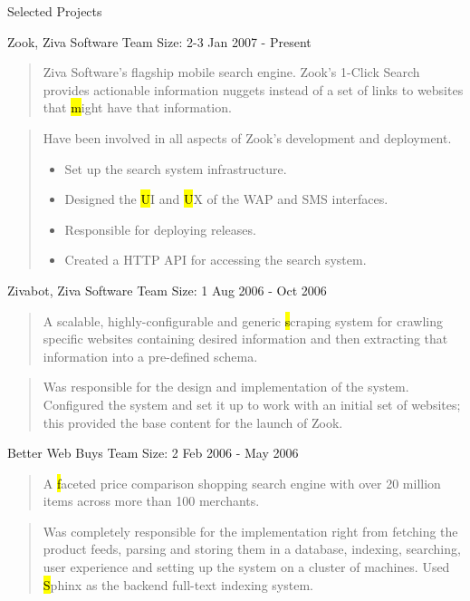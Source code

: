 \documentclass{resume}
\newcommand{\teamsize}{\hfill\sc\footnotesize Team Size: }
\begin{document}
\begin{category}{Selected Projects}{}
    \item {\topic Zook,} Ziva Software
        {\teamsize 2-3}
        {\period Jan 2007 - Present}

        \begin{quote}
            Ziva Software's flagship mobile search engine. Zook's 1-Click
            Search provides actionable information nuggets instead of a set of
            links to websites that {\hl might} have that information.
        \end{quote}

        \begin{quote}
            Have been involved in all aspects of Zook's development and
            deployment.
            \begin{itemize}
                \item Set up the search system infrastructure.
                \item Designed the {\hl UI} and {\hl UX} of the WAP and SMS
                    interfaces.
                \item Responsible for deploying releases.
                \item Created a HTTP API for accessing the search system.
            \end{itemize}
        \end{quote}

    \pagebreak

    \item {\topic Zivabot,} Ziva Software
        {\teamsize 1}
        {\period Aug 2006 - Oct 2006}
        \begin{quote}
            A scalable, highly-configurable and generic {\hl scraping system}
            for crawling specific websites containing desired information and
            then extracting that information into a pre-defined schema.
        \end{quote}
        \begin{quote}
            Was responsible for the design and implementation of the system.
            Configured the system and set it up to work with an initial set of
            websites; this provided the base content for the launch of Zook.
        \end{quote}

    \item {\topic Better Web Buys}
        {\teamsize 2}
        {\period Feb 2006 - May 2006}
        \begin{quote}
            A {\hl faceted price comparison shopping search engine} with over
            20 million items across more than 100 merchants.
        \end{quote}
        \begin{quote}
            Was completely responsible for the implementation right from
            fetching the product feeds, parsing and storing them in a database,
            indexing, searching, user experience and setting up the system on a
            cluster of machines. Used {\hl Sphinx} as the backend full-text
            indexing system.
        \end{quote}


\end{category}
\end{document}
